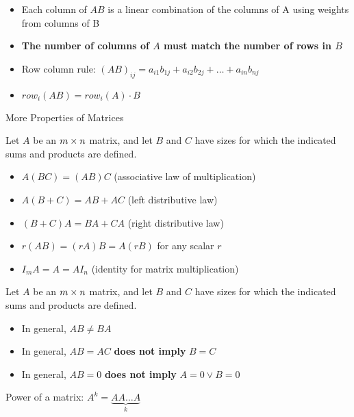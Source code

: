 \documentclass{report}
\begin{document}
\begin{itemize}
\item Each column of $AB$ is a linear combination of the columns of A using weights from columns of B
\item \textbf{The number of columns of $A$ must match the number of rows in $B$ }
\item Row column rule: $(AB)_{ij} = a_{i1}b_{1j} + a_{i2}b_{2j} + \ldots + a_{in}b_{nj}$
\item $row_i(AB) = row_i(A)\cdot B$
\end{itemize}

\begin{theorem} More Properties of Matrices
\begin{tcolorbox}[colback=blue!5!white, colframe=blue!75!black]
    Let $A$ be an $m \times n$ matrix, and let $B$ and $C$ have sizes for which the indicated sums and products are defined.
        
\begin{itemize}
    \item[] $A(BC) = (AB)C$ \hfill (associative law of multiplication)
    \item[] $A(B + C) = AB + AC$ \hfill (left distributive law)
    \item[] $(B + C)A = BA + CA$ \hfill (right distributive law)
    \item[] $r(AB) = (rA)B = A(rB)$ for any scalar $r$
    \item[] $I_m A = A = A I_n$ \hfill (identity for matrix multiplication)
\end{itemize}
\end{tcolorbox}
\end{theorem}

\begin{tcolorbox}[colback=blue!5!white, colframe=red!75!black, title=WARNING]
Let $A$ be an $m \times n$ matrix, and let $B$ and $C$ have sizes for which the indicated sums and products are defined.

\begin{itemize}
    \item In general, $AB \ne BA$
    \item In general, $AB = AC$ \textbf{does not imply} $B = C$
    \item In general, $AB = 0$ \textbf{does not imply} $A = 0 \vee B = 0$
\end{itemize}
\end{tcolorbox}

Power of a matrix: $A^k = \underbrace{A A \dots A}_{k}$ \\
\end{document}
